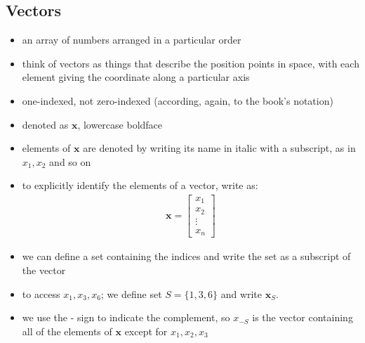 \documentclass[11pt,twocolumn]{report}
\begin{document}
\subsection{Vectors}
\begin{itemize}
  \item an array of numbers arranged in a particular order
  \item think of vectors as things that describe the position points in space,
    with each element giving the coordinate along a particular axis
  \item one-indexed, not zero-indexed (according, again, to the book's notation)
  \item denoted as $\bm{x}$, lowercase boldface
  \item elements of $\bm{x}$ are denoted by writing its name in italic with a
    subscript, as in \textbf{$x_1, x_2$} and so on
  \item to explicitly identify the elements of a vector, write as:
    \begin{gather}
      \bm{x} = 
      \begin{bmatrix}
        x_1\\
        x_2\\
        \vdots\\
        x_n
      \end{bmatrix}
    \end{gather}
  \item we can define a set containing the indices and write the set as a
    subscript of the vector 
  \item to access $x_1, x_3, x_6$; we define set $S = \{1, 3, 6\}$ and write
    $\bm{x}_S$.
  \item we use the - sign to indicate the complement, so $x_{-S}$ is the vector
    containing all of the elements of $\bm{x}$ except for $x_1, x_2, x_3$
\end{itemize}
\end{document}
